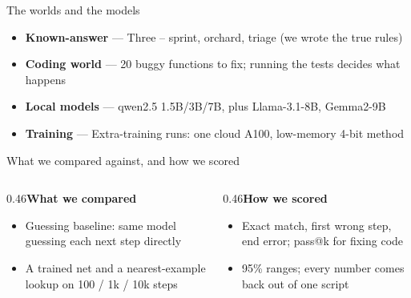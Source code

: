 \documentclass[aspectratio=169,11pt]{beamer}
\begin{document}
\begin{frame}{The worlds and the models}\vfill\begin{itemize}\item \textbf{Known-answer} --- Three -- sprint, orchard, triage (we wrote the true rules)\item \textbf{Coding world} --- 20 buggy functions to fix; running the tests decides what happens\item \textbf{Local models} --- qwen2.5 1.5B/3B/7B, plus Llama-3.1-8B, Gemma2-9B\item \textbf{Training} --- Extra-training runs: one cloud A100, low-memory 4-bit method\end{itemize}\vfill\end{frame}
\begin{frame}{What we compared against, and how we scored}\vfill
\begin{columns}[T]
\begin{column}{0.46\textwidth}{\color{owmuted}\bfseries\large What we compared}\par\medskip\begin{itemize}\small \item Guessing baseline: same model guessing each next step directly
\item A trained net and a nearest-example lookup on 100 / 1k / 10k steps\end{itemize}\end{column}
\begin{column}{0.46\textwidth}{\color{owteal}\bfseries\large How we scored}\par\medskip\begin{itemize}\small \item Exact match, first wrong step, end error; pass@k for fixing code
\item 95\% ranges; every number comes back out of one script\end{itemize}\end{column}
\end{columns}\vfill\end{frame}
\end{document}

